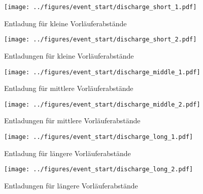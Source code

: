 \begin{figure}[H]
    \centering
    \begin{minipage}[t]{0.44\textwidth}
        \centering
        \texttt{[image: ../figures/event\_start/discharge\_short\_1.pdf]}
        \caption{Entladung für kleine Vorläuferabstände}
        \label{fig:discharge-vor-klein-1}
    \end{minipage}
    \hfill
    \begin{minipage}[t]{0.44\textwidth}
        \centering
        \texttt{[image: ../figures/event\_start/discharge\_short\_2.pdf]}
        \caption{Entladungen für kleine Vorläuferabstände}
        \label{fig:discharge-vor-klein-2}
    \end{minipage}
\end{figure}



\begin{figure}[H]
    \centering
    \begin{minipage}[t]{0.44\textwidth}
        \centering
        \texttt{[image: ../figures/event\_start/discharge\_middle\_1.pdf]}
        \caption{Entladung für mittlere Vorläuferabstände}
        \label{fig:discharge-vor-mittel-1}
    \end{minipage}
    \hfill
    \begin{minipage}[t]{0.44\textwidth}
        \centering
        \texttt{[image: ../figures/event\_start/discharge\_middle\_2.pdf]}
        \caption{Entladungen für mittlere Vorläuferabstände}
        \label{fig:discharge-vor-mittel-2}
    \end{minipage}
\end{figure}

\begin{figure}[H]
    \centering
    \begin{minipage}[t]{0.44\textwidth}
        \centering
        \texttt{[image: ../figures/event\_start/discharge\_long\_1.pdf]}
        \caption{Entladung für längere Vorläuferabstände}
        \label{fig:discharge-vor-lang-1}
    \end{minipage}
    \hfill
    \begin{minipage}[t]{0.44\textwidth}
        \centering
        \texttt{[image: ../figures/event\_start/discharge\_long\_2.pdf]}
        \caption{Entladungen für längere Vorläuferabstände}
        \label{fig:discharge-vor-lang-2}
    \end{minipage}
\end{figure}

